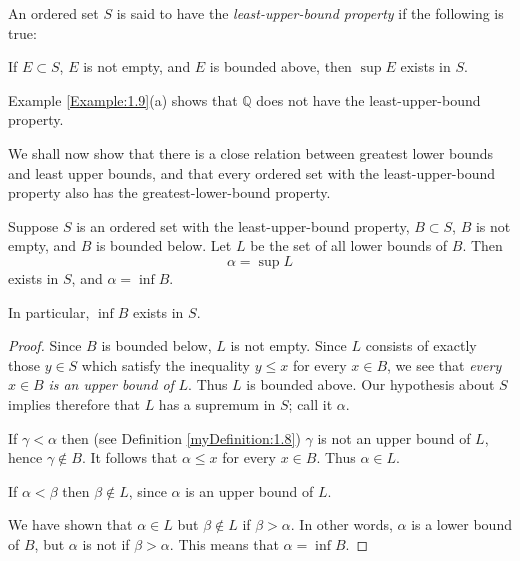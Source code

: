 \begin{myDefinition}\label{myDefinition:1.10}
{\color{red}{least-upper-bound property}}

An ordered set $S$ is said to have the \emph{least-upper-bound property}
if the following is true:

If $E \subset S$, $E$ is not empty, and $E$ is bounded above, then $\sup E$ exists in $S$.
\end{myDefinition}

Example \ref{Example:1.9}(a) shows that $\mathbb{Q}$ does not have the least-upper-bound property.

We shall now show that there is a close relation between greatest lower
bounds and least upper bounds, and that every ordered set with the least-upper-bound property also has the greatest-lower-bound property.

\begin{thm}\label{thm:1.11}
Suppose $S$ is an ordered set with the least-upper-bound property,
$B \subset S$, $B$ is not empty, and $B$ is bounded below. Let $L$ be the set of all lower
bounds of $B$. Then
\begin{equation*}
    \alpha = \sup L
\end{equation*}
exists in $S$, and $\alpha = \inf B$.

In particular, $\inf B$ exists in $S$.
\end{thm}

\begin{proof}
Since $B$ is bounded below, $L$ is not empty. Since $L$ consists of
exactly those $y \in S$ which satisfy the inequality $y \leq x$ for every $x \in B$, we
see that \emph{every} $x \in B$ \emph{is an upper bound of} $L$. Thus $L$ is bounded above.
Our hypothesis about $S$ implies therefore that $L$ has a supremum in $S$;
call it $\alpha$.

If $\gamma <\alpha$ then (see Definition \ref{myDefinition:1.8}) $\gamma$ is not an upper bound of $L$,
hence $\gamma \not\in B$. It follows that $\alpha \leq x$ for every $x \in B$. Thus $\alpha \in L$.

If $\alpha < \beta$ then $\beta \not\in L$, since $\alpha$ is an upper bound of $L$.

We have shown that $\alpha \in L$ but $\beta \not\in  L$ if $\beta>\alpha$. In other words, $\alpha$
is a lower bound of $B$, but $\alpha$ is not if $\beta > \alpha$. This means that $\alpha = \inf B$.
\end{proof}

